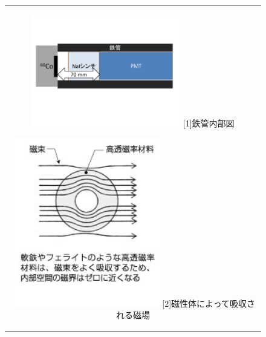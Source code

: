 \begin{figure}[tbp]
  \begin{center}
    \begin{tabular}{c}
      \begin{minipage}[h]{0.5\hsize}    
        \begin{center}
          \includegraphics[width=6.5cm]{fig/iguchi/PMTinFe.pdf}
	\hspace{3cm}[1]鉄管内部図
     \end{center}
    \end{minipage}
      \begin{minipage}[h]{0.5\hsize}    
        \begin{center}
          \includegraphics[width=6.5cm]{fig/iguchi/jibakyusyu.jpg}
         \hspace{3cm}[2]磁性体によって吸収される磁場
         \end{center}
        \end{minipage}
     
     \end{tabular}
    \end{center}
   \end{figure}
   

